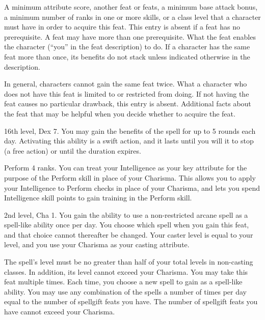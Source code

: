  A minimum attribute score, another feat or feats, a minimum base attack bonus, a minimum number of ranks in one or more skills, or a class level that a character must have in order to acquire this feat. This entry is absent if a feat has no prerequisite. A feat may have more than one prerequisite.
 What the feat enables the character (``you'' in the feat description) to do. If a character has the same feat more than once, its benefits do not stack unless indicated otherwise in the description.
\par In general, characters cannot gain the same feat twice.
 What a character who does not have this feat is limited to or restricted from doing. If not having the feat causes no particular drawback, this entry is absent.
 Additional facts about the feat that may be helpful when you decide whether to acquire the feat.

\featpre 16th level, Dex 7.
\featben You may gain the benefits of the  spell for up to 5 rounds each day. Activating this ability is a swift action, and it lasts until you will it to stop (a free action) or until the duration expires.

\featpre Perform 4 ranks.
\featben You can treat your Intelligence as your key attribute for the purpose of the Perform skill in place of your Charisma. This allows you to apply your Intelligence to Perform checks in place of your Charisma, and lets you spend Intelligence skill points to gain training in the Perform skill.

\featpre 2nd level, Cha 1.
\featben You gain the ability to use a non-restricted arcane spell as a spell-like ability once per day. You choose which spell when you gain this feat, and that choice cannot thereafter be changed. Your caster level is equal to your level, and you use your Charisma as your casting attribute.

The spell's level must be no greater than half of your total levels in non-casting classes. In addition, its level cannot exceed your Charisma.
 You may take this feat multiple times. Each time, you choose a new spell to gain as a spell-like ability. You may use any combination of the spells a number of times per day equal to the number of spellgift feats you have. The number of spellgift feats you have cannot exceed your Charisma.

